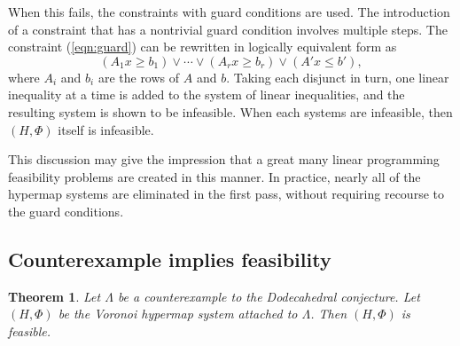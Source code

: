 \documentclass{article} %
\newtheorem{theorem}{Theorem}[section]
\begin{document}
When this fails, the constraints with guard conditions are
used.
The introduction of a constraint that has a nontrivial guard condition
involves multiple steps.  
The constraint (\ref{eqn:guard}) can be rewritten in logically
equivalent form as
  $$
   (A_{1} x \ge b_{1}) \lor \cdots \lor
   (A_{r} x \ge b_{r}) \lor (A' x \le b'),
  $$
where $A_{i}$ and $b_{i}$ are the rows of $A$ and $b$.
Taking each disjunct in turn, one linear inequality at a time
is added to the system
of linear inequalities, and the resulting system is shown to be
infeasible.  When each
systems are infeasible, then $(H,\Phi)$ itself is infeasible.


This discussion may give the impression 
that a great many linear programming feasibility
problems are created in this manner.  In practice, nearly all
of the hypermap systems are eliminated in the first pass, without
requiring recourse to the guard conditions.  

\subsection{Counterexample implies feasibility}

\begin{theorem}\label{thm:feasible}  Let $\Lambda$ be a counterexample to the Dodecahedral conjecture.  Let $(H,\Phi)$ be the Voronoi hypermap system attached to $\Lambda$.
Then $(H,\Phi)$ is feasible.
\end{theorem}
\end{document}
